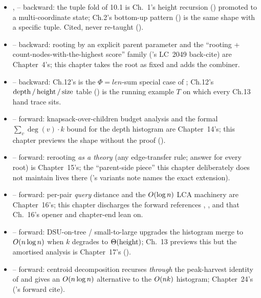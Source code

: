 
\begin{itemize}[nosep, leftmargin=1.4em]
  \item {},  -- backward: the tuple fold of
        10.1 is Ch.~1's height recursion ()
        promoted to a multi-coordinate state; Ch.2's bottom-up pattern
        () is the same shape with a specific tuple. Cited,
        never re-taught ().
  \item {} -- backward: rooting by an explicit parent
        parameter and the ``rooting + count-nodes-with-the-highest
        score'' family ('s LC~2049 back-cite) are
        Chapter~4's; this chapter takes the root as fixed and adds the
        combiner.
  \item {} -- backward: Ch.12's  is the
        $\Phi=\mathit{len}$-sum special case of ;
        Ch.12's $\operatorname{depth}/\operatorname{height}/\operatorname{size}$ table () is
        the running example $T$ on which every Ch.13 hand trace sits.
  \item {} -- forward: knapsack-over-children budget analysis
        and the formal $\sum_v \deg(v)\cdot k$ bound for the depth
        histogram are Chapter~14's; this chapter previews the shape
        without the proof ().
  \item {} -- forward: rerooting \emph{as a theory} (any
        edge-transfer rule; answer for every root) is Chapter~15's;
        the ``parent-side piece'' this chapter deliberately does not
        maintain lives there ('s variants note
        names the exact extension).
  \item {} -- forward: per-pair \emph{query} distance and the
        $O(\log n)$ LCA machinery are Chapter~16's; this chapter
        discharges the forward references ,
        , and  that Ch.~16's opener
        and chapter-end lean on.
  \item {} -- forward: DSU-on-tree / small-to-large upgrades
        the histogram merge to $O(n\log n)$ when $k$ degrades to
        $\Theta(\operatorname{height})$; Ch.~13 previews this but the amortised
        analysis is Chapter~17's ().
  \item {} -- forward: centroid decomposition recurses
        \emph{through} the peak-harvest identity of 
        and gives an $O(n\log n)$ alternative to the $O(nk)$
        histogram; Chapter~24's ('s forward cite).
\end{itemize}

